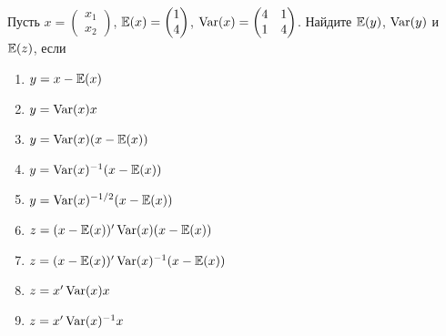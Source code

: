 \documentclass[pdftex,11pt,openany]{book}\usepackage[]{graphicx}\usepackage[]{color}
\begin{document}
\begin{solution}
\end{solution}


\begin{problem}
Пусть  $x = \begin{pmatrix} x_1 \\ x_2 \end{pmatrix}$, $\mathbb{E}(x) = \begin{pmatrix} 1 \\ 4 \end{pmatrix}$, $\operatorname{Var}(x) = \begin{pmatrix} 4 & 1 \\ 1 & 4 \end{pmatrix}$. Найдите $\mathbb{E}(y)$, $\operatorname{Var}(y)$ и $\mathbb{E}(z)$, если
\begin{enumerate}
\item $y = x - \mathbb{E}(x)$
\item $y = \operatorname{Var}(x)x$
\item $y = \operatorname{Var}(x)(x - \mathbb{E}(x))$
\item $y = \operatorname{Var}(x)^{-1}(x - \mathbb{E}(x))$
\item $y = \operatorname{Var}(x)^{-1/2}(x - \mathbb{E}(x))$
\item $z = (x - \mathbb{E}(x))'\operatorname{Var}(x)(x - \mathbb{E}(x))$
\item $z = (x - \mathbb{E}(x))'\operatorname{Var}(x)^{-1}(x - \mathbb{E}(x))$
\item $z = x'\operatorname{Var}(x)x$
\item $z = x'\operatorname{Var}(x)^{-1}x$
\end{enumerate}


\end{problem}

\begin{solution}
\end{solution}
\end{document}
